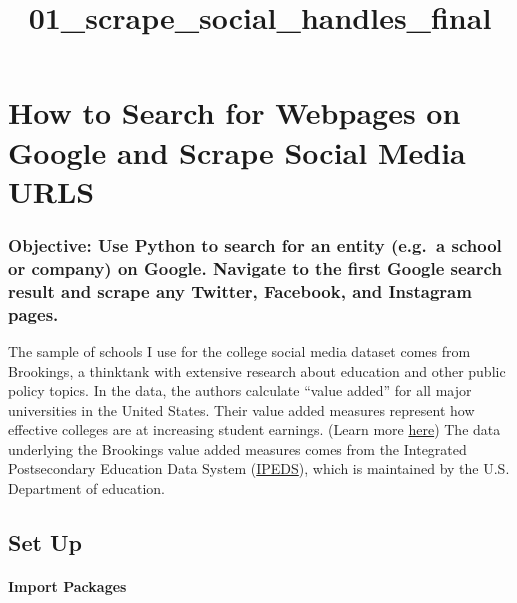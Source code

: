 \documentclass[11pt]{article}
\title{01\_scrape\_social\_handles\_final}
\begin{document}
    
    
    \maketitle
    
    

    
    \hypertarget{how-to-search-for-webpages-on-google-and-scrape-social-media-urls}{%
\section{How to Search for Webpages on Google and Scrape Social Media
URLS}\label{how-to-search-for-webpages-on-google-and-scrape-social-media-urls}}

    \hypertarget{objective-use-python-to-search-for-an-entity-e.g.a-school-or-company-on-google.-navigate-to-the-first-google-search-result-and-scrape-any-twitter-facebook-and-instagram-pages.}{%
\subsubsection{Objective: Use Python to search for an entity (e.g.~a
school or company) on Google. Navigate to the first Google search result
and scrape any Twitter, Facebook, and Instagram
pages.}\label{objective-use-python-to-search-for-an-entity-e.g.a-school-or-company-on-google.-navigate-to-the-first-google-search-result-and-scrape-any-twitter-facebook-and-instagram-pages.}}

    The sample of schools I use for the college social media dataset comes
from Brookings, a thinktank with extensive research about education and
other public policy topics. In the data, the authors calculate ``value
added'' for all major universities in the United States. Their value
added measures represent how effective colleges are at increasing
student earnings. (Learn more
\href{https://www.brookings.edu/research/using-earnings-data-to-rank-colleges-a-value-added-approach-updated-with-college-scorecard-data/}{here})
The data underlying the Brookings value added measures comes from the
Integrated Postsecondary Education Data System
(\href{https://nces.ed.gov/ipeds/}{IPEDS}), which is maintained by the
U.S. Department of education.

    \hypertarget{set-up}{%
\subsection{Set Up}\label{set-up}}

    \hypertarget{import-packages}{%
\paragraph{Import Packages}\label{import-packages}}
\end{document}
